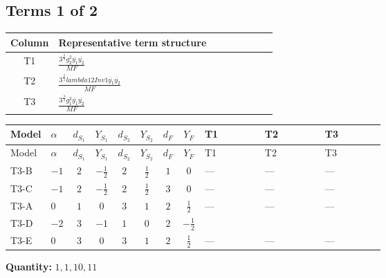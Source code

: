 \documentclass[8pt]{article}
\begin{document}
\begin{landscape}
\subsection*{Terms 1 of 2}
\begin{center}
\begin{tabular}{@{}c >{\raggedright\arraybackslash}p{0.82\linewidth}@{}}
\toprule
Column & Representative term structure \\
\midrule
T1 & \(\displaystyle \frac{3^{\frac{3}{4}} g_{2}^{2} \overline{y_{1}} \overline{y_{2}}}{MF}\) \\
\midrule
T2 & \(\displaystyle \frac{3^{\frac{3}{4}} lambda12Inv1 \overline{y_{1}} \overline{y_{2}}}{MF}\) \\
\midrule
T3 & \(\displaystyle \frac{3^{\frac{3}{4}} g_{1}^{2} \overline{y_{1}} \overline{y_{2}}}{MF}\) \\
\midrule
\bottomrule
\end{tabular}
\end{center}
\smallskip
\tiny
\begin{longtable}{@{}llcccccc >{\raggedright\arraybackslash}p{0.21\linewidth} >{\raggedright\arraybackslash}p{0.21\linewidth} >{\raggedright\arraybackslash}p{0.21\linewidth}@{}}
\toprule
Model & $\alpha$ & $d_{S_1}$ & $Y_{S_1}$ & $d_{S_2}$ & $Y_{S_2}$ & $d_F$ & $Y_F$ & T1 & T2 & T3 \\
\midrule
\endfirsthead
\toprule
Model & $\alpha$ & $d_{S_1}$ & $Y_{S_1}$ & $d_{S_2}$ & $Y_{S_2}$ & $d_F$ & $Y_F$ & T1 & T2 & T3 \\
\midrule
\endhead
T3-B & $-1$ & $2$ & $-\frac{1}{2}$ & $2$ & $\frac{1}{2}$ & $1$ & $0$ & --- & --- & --- \\
\midrule
T3-C & $-1$ & $2$ & $-\frac{1}{2}$ & $2$ & $\frac{1}{2}$ & $3$ & $0$ & --- & --- & --- \\
\midrule
T3-A & $0$ & $1$ & $0$ & $3$ & $1$ & $2$ & $\frac{1}{2}$ & --- & --- & --- \\
\midrule
T3-D & $-2$ & $3$ & $-1$ & $1$ & $0$ & $2$ & $-\frac{1}{2}$ & \scriptsize\adjustbox{max width=\linewidth}{$\begin{gathered} - \frac{11 \cdot 3^{\frac{3}{4}} g_{2}^{2} \overline{y_{1}} \overline{y_{2}}}{8 MF}\end{gathered}$} & \scriptsize\adjustbox{max width=\linewidth}{$\begin{gathered} - \frac{3^{\frac{3}{4}} lambda12Inv1 \overline{y_{1}} \overline{y_{2}}}{6 MF}\end{gathered}$} & \scriptsize\adjustbox{max width=\linewidth}{$\begin{gathered} - \frac{3^{\frac{3}{4}} g_{1}^{2} \overline{y_{1}} \overline{y_{2}}}{8 MF}\end{gathered}$} \\
\midrule
T3-E & $0$ & $3$ & $0$ & $3$ & $1$ & $2$ & $\frac{1}{2}$ & --- & --- & --- \\
\midrule
\bottomrule
\end{longtable}
\clearpage
\noindent\textbf{Quantity: }$\mathrm{1,1,10,11}$\par\smallskip

\end{landscape}
\end{document}
